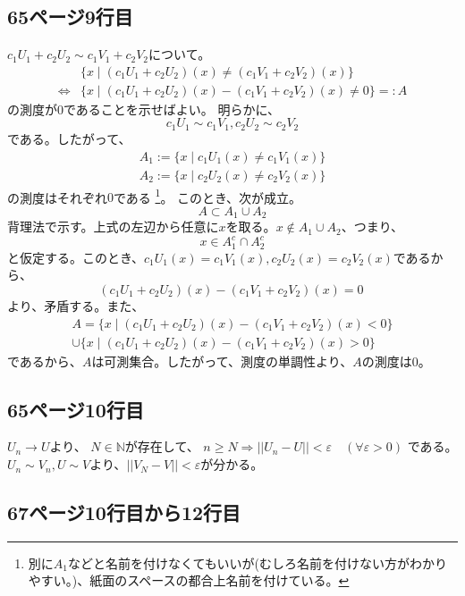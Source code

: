 \documentclass[11pt, a4paper]{jsarticle}
\theoremstyle{definition}
\newcommand{\NN}{{\mathbb{N}}} %
\begin{document}
    \subsection{65ページ9行目}
      $c_1U_1 + c_2U_2 \sim c_1V_1 + c_2V_2$について。\\
      \begin{align*}
        &\{x \mid (c_1U_1 + c_2U_2)(x) \neq (c_1V_1 + c_2V_2)(x)\} \\
        \Leftrightarrow &\{x \mid (c_1U_1 + c_2U_2)(x) - (c_1V_1 + c_2V_2)(x) \neq 0\} =: A
      \end{align*}
      の測度が$0$であることを示せばよい。
      明らかに、
      \[
        c_1U_1 \sim c_1V_1, c_2U_2 \sim c_2V_2
      \]
      である。したがって、
      \begin{align*}
        A_1 := \{x \mid c_1U_1(x) \neq c_1V_1(x)\} \\
        A_2 := \{x \mid c_2U_2(x) \neq c_2V_2(x)\}
      \end{align*}
      の測度はそれぞれ$0$である
      \footnote{別に$A_1$などと名前を付けなくてもいいが(むしろ名前を付けない方がわかりやすい。)、紙面のスペースの都合上名前を付けている。}。
      このとき、次が成立。
      \[
        A \subset A_1 \cup A_2
      \]
      背理法で示す。上式の左辺から任意に$x$を取る。$x \notin A_1 \cup A_2$、つまり、
      \[
        x \in A_1^c \cap A_2^c
        \]
      と仮定する。このとき、$c_1U_1(x) = c_1V_1(x), c_2U_2(x) = c_2V_2(x)$であるから、
      \[
        (c_1U_1 + c_2U_2)(x) - (c_1V_1 + c_2V_2)(x) = 0\
      \]
      より、矛盾する。また、
      \begin{multline*}
        A = \{x \mid (c_1U_1 + c_2U_2)(x) - (c_1V_1 + c_2V_2)(x) < 0\} \\
        \cup \{x \mid (c_1U_1 + c_2U_2)(x) - (c_1V_1 + c_2V_2)(x) > 0\}
      \end{multline*}
      であるから、$A$は可測集合。したがって、測度の単調性より、$A$の測度は$0$。

    \subsection{65ページ10行目}
      $U_n \to U$より、
      $N \in \NN$が存在して、
      $n \ge N \Rightarrow ||U_n - U|| < \varepsilon \quad (\forall \varepsilon > 0)$
      である。
      $U_n \sim V_n, U \sim V$より、$||V_N - V|| < \varepsilon$が分かる。

    \subsection{67ページ10行目から12行目}
\end{document}
